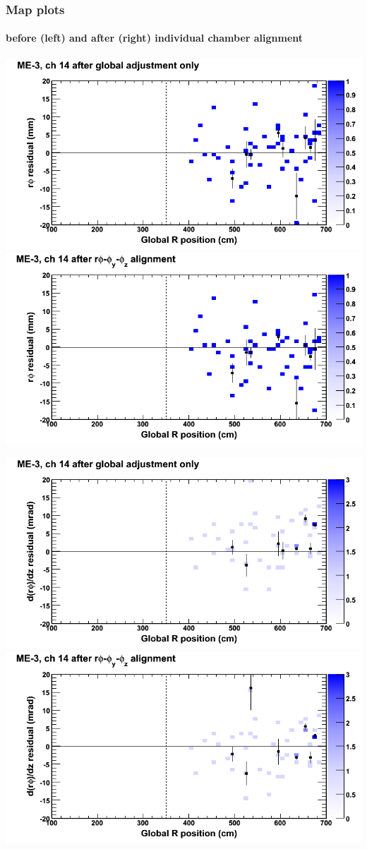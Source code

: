 \documentclass[compress]{beamer}
\begin{document}
\begin{frame}
\frametitle{Map plots}
\framesubtitle{before (left) and after (right) individual chamber alignment}
\includegraphics[width=0.5\linewidth]{ringmapplots_3dof/before_CSCvsr_mem3ch14_x.png} \includegraphics[width=0.5\linewidth]{ringmapplots_3dof/after_CSCvsr_mem3ch14_x.png}

\includegraphics[width=0.5\linewidth]{ringmapplots_3dof/before_CSCvsr_mem3ch14_dxdz.png} \includegraphics[width=0.5\linewidth]{ringmapplots_3dof/after_CSCvsr_mem3ch14_dxdz.png}
\end{frame}
\end{document}
